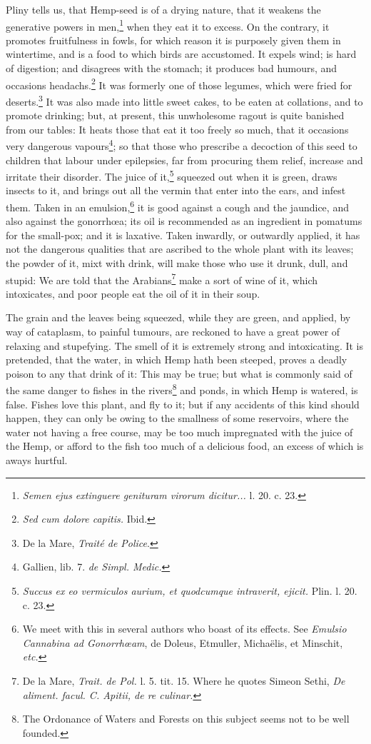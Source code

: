 \documentclass[a4paper, 11pt, oneside, polutonikogreek, english]{article}
\begin{document}
Pliny tells us, that Hemp-seed is of a drying nature, that it weakens the generative powers in men,\footnote{\emph{Semen ejus extinguere genituram virorum dicitur...} l. 20. c. 23.} when they eat it to excess. On the contrary, it promotes fruitfulness in fowls, for which reason it is purposely given them in wintertime, and is a food to which birds are accustomed. It expels wind; is hard of digestion; and disagrees with the stomach; it produces bad humours, and occasions headachs.\footnote{\emph{Sed cum dolore capitis.} Ibid.} It was formerly one of those legumes, which were fried for deserts.\footnote{De la Mare, \emph{Traité de Police}.} It was also made into little sweet cakes, to be eaten at collations, and to promote drinking; but, at present, this unwholesome ragout is quite banished from our tables: It heats those that eat it too freely so much, that it occasions very dangerous vapours\footnote{Gallien, lib. 7. \emph{de Simpl. Medic.}}; so that those who prescribe a decoction of this seed to children that labour under epilepsies, far from procuring them relief, increase and irritate their disorder. The juice of it,\footnote{\emph{Succus ex eo vermiculos aurium, et quodcumque intraverit, ejicit.} Plin. l. 20. c. 23.} squeezed out when it is green, draws insects to it, and brings out all the vermin that enter into the ears, and infest them. Taken in an emulsion,\footnote{We meet with this in several authors who boast of its effects. See \emph{Emulsio Cannabina ad Gonorrhœam}, de Doleus, Etmuller, Michaëlis, et Minschit, \emph{etc.}} it is good against a cough and the jaundice, and also against the gonorrhœa; its oil is recommended as an ingredient in pomatums for the small-pox; and it is laxative. Taken inwardly, or outwardly applied, it has not the dangerous qualities that are ascribed to the whole plant with its leaves; the powder of it, mixt with drink, will make those who use it drunk, dull, and stupid: We are told that the Arabians\footnote{De la Mare, \emph{Trait. de Pol.} l. 5. tit. 15. Where he quotes Simeon Sethi, \emph{De aliment. facul. C. Apitii, de re culinar.}} make a sort of wine of it, which intoxicates, and poor people eat the oil of it in their soup.

The grain and the leaves being squeezed, while they are green, and applied, by way of cataplasm, to painful tumours, are reckoned to have a great power of relaxing and stupefying. The smell of it is extremely strong and intoxicating. It is pretended, that the water, in which Hemp hath been steeped, proves a deadly poison to any that drink of it: This may be true; but what is commonly said of the same danger to fishes in the rivers\footnote{The Ordonance of Waters and Forests on this subject seems not to be well founded.} and ponds, in which Hemp is watered, is false. Fishes love this plant, and fly to it; but if any accidents of this kind should happen, they can only be owing to the smallness of some reservoirs, where the water not having a free course, may be too much impregnated with the juice of the Hemp, or afford to the fish too much of a delicious food, an excess of which is aways hurtful.
\end{document}
